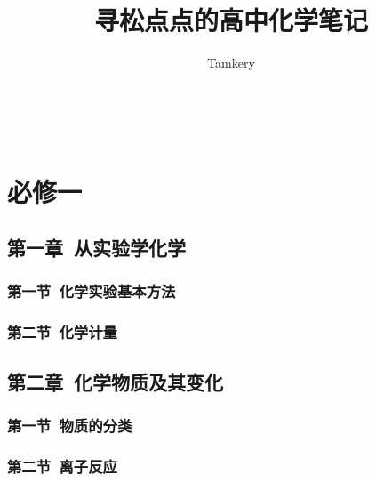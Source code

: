 \documentclass{book}
\title{寻松点点的高中化学笔记}
\author{Tamkery }
\begin{document}
\maketitle
\tableofcontents



\newcommand\ncoord[2][0,0]{%
    \tikz[remember picture,overlay]{\path (#1) coordinate (#2);}%
}

\newcommand\ccoord[1]{\ncoord[0.5em,0.9em]{#1}}%
\newcommand\bcoord[1]{\ncoord[0.4em,-0.3em]{#1}}%
\newcommand\dcoord[1]{\ncoord[0.9em,1.5em]{#1}}%
\newcommand\ecoord[1]{\ncoord[0.9em,-0.3em]{#1}}%




~



\part{必修一}

\chapter{第一章\ 从实验学化学}


\section{第一节\  化学实验基本方法}

\section{第二节\  化学计量}	


\chapter{第二章\ 化学物质及其变化}

\section{第一节\  物质的分类}

\section{第二节\  离子反应}
\end{document}
